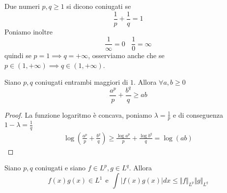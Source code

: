 \begin{defn}
Due numeri $p, q\geq 1$ si dicono coniugati se
\begin{equation*}
\frac{1}{p} + \frac{1}{q} = 1
\end{equation*}
Poniamo inoltre
\begin{equation*}
\frac{1}{\infty} = 0\ \ \ \ \frac{1}{0} = \infty
\end{equation*}
quindi se $p = 1\implies q = + \infty $, osserviamo anche che se $p\in (1, + \infty) \implies q\in (1, + \infty)$.
\end{defn}
\begin{thm}
Siano $p, q$ coniugati entrambi maggiori di $1$. Allora $\forall a, b\geq 0$
\begin{equation*}
\frac{a^{p}}{p} + \frac{b^{q}}{q} \geq ab
\end{equation*}
\end{thm}
\begin{proof}

La funzione logaritmo è concava, poniamo $\lambda = \frac{1}{p}$ e di conseguenza $1 - \lambda = \frac{1}{q}$
\begin{gather*}
\log\left(\frac{a^{p}}{p} + \frac{b^{q}}{q}\right) \geq \frac{\log a^{p}}{p} + \frac{\log b^{q}}{q} = \log(ab)
\end{gather*}
\end{proof}
\begin{thm}
Siano $p, q$ coniugati e siano $f\in L^{p}, g\in L^{q}$. Allora
\begin{equation*}
f(x) g(x) \in L^{1} \ \ \text{e} \ \ \int | f(x) g(x)| dx\leq \Vert f \Vert_{L^{p}} \Vert g \Vert_{L^{q}}
\end{equation*}
\end{thm}
